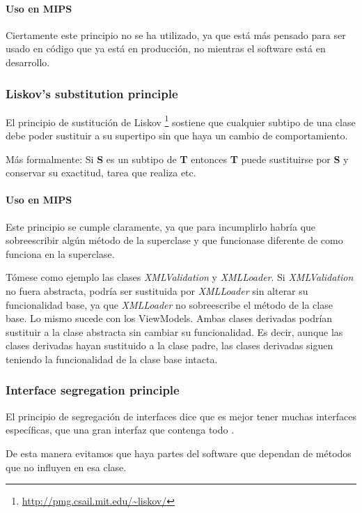 \paragraph{Uso en MIPS}
Ciertamente este principio no se ha utilizado, ya que est\'a m\'as pensado para ser usado en
c\'odigo que ya est\'a en producci\'on, no mientras el software est\'a en desarrollo.

\subsubsection{Liskov's substitution principle}
El principio de sustituci\'{o}n de Liskov \cite{SOLID:LSP} \footnote{\url{http://pmg.csail.mit.edu/~liskov/}} 
sostiene que cualquier subtipo de una clase
debe poder sustituir a su supertipo sin que haya un cambio de comportamiento.

M\'{a}s formalmente: Si \textbf{S} es un subtipo de \textbf{T} entonces \textbf{T} puede sustituirse por \textbf{S} y 
conservar su exactitud, tarea que realiza etc.

\paragraph{Uso en MIPS}
Este principio se cumple claramente, ya que para incumplirlo habr\'ia que sobreescribir alg\'un m\'etodo de la superclase
y que funcionase diferente de como funciona en la superclase. 

T\'omese como ejemplo las clases \emph{XMLValidation} y \emph{XMLLoader}.
Si \emph{XMLValidation} no fuera abstracta, podr\'ia ser sustituida por \emph{XMLLoader}
sin alterar su funcionalidad base, ya que \emph{XMLLoader} no sobreescribe el m\'etodo de la clase base. Lo mismo
sucede con los ViewModels. Ambas clases derivadas podr\'ian sustituir a la clase abstracta sin cambiar su funcionalidad. Es
decir, aunque las clases derivadas hayan sustituido a la clase padre, las clases derivadas siguen teniendo la funcionalidad
de la clase base intacta.

\subsubsection{Interface segregation principle}
El principio de segregaci\'{o}n de interfaces dice que es mejor tener muchas interfaces espec\'{i}ficas, 
que una gran interfaz que contenga todo \cite{SOLID:ISP}.

De esta manera evitamos que haya partes del software que dependan de m\'{e}todos que no influyen en esa clase.

